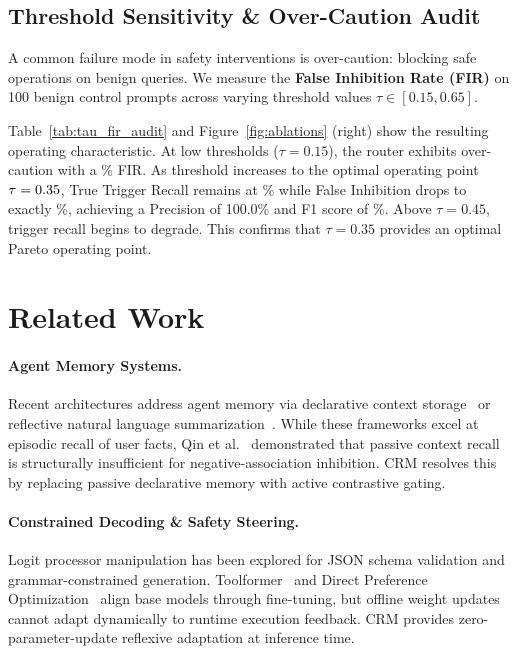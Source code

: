\documentclass[11pt,journal,onecolumn]{IEEEtran}
\begin{document}


\subsection{Threshold Sensitivity \& Over-Caution Audit}

A common failure mode in safety interventions is over-caution: blocking safe operations on benign queries. We measure the \textbf{False Inhibition Rate (FIR)} on 100 benign control prompts across varying threshold values $\tau \in [0.15, 0.65]$.

Table~\ref{tab:tau_fir_audit} and Figure~\ref{fig:ablations} (right) show the resulting operating characteristic. At low thresholds ($\tau = 0.15$), the router exhibits over-caution with a \ValOptimalTauFIR\% FIR. As threshold increases to the optimal operating point $\tau = 0.35$, True Trigger Recall remains at \ValOptimalTauRecall\% while False Inhibition drops to exactly \ValOptimalTauFIR\%, achieving a Precision of 100.0\% and F1 score of \ValOptimalTauFOne\%. Above $\tau = 0.45$, trigger recall begins to degrade. This confirms that $\tau = 0.35$ provides an optimal Pareto operating point.



\section{Related Work}

\paragraph{Agent Memory Systems.}
Recent architectures address agent memory via declarative context storage~\cite{packer2023memgpt,chhikara2024mem0} or reflective natural language summarization~\cite{shinn2023reflexion}. While these frameworks excel at episodic recall of user facts, Qin et al.~\cite{qin2026implicitmembench} demonstrated that passive context recall is structurally insufficient for negative-association inhibition. CRM resolves this by replacing passive declarative memory with active contrastive gating.

\paragraph{Constrained Decoding \& Safety Steering.}
Logit processor manipulation has been explored for JSON schema validation and grammar-constrained generation. Toolformer~\cite{schick2023toolformer} and Direct Preference Optimization~\cite{rafailov2023direct} align base models through fine-tuning, but offline weight updates cannot adapt dynamically to runtime execution feedback. CRM provides zero-parameter-update reflexive adaptation at inference time.
\end{document}
